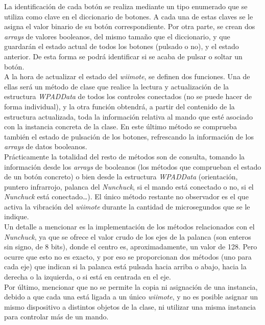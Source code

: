 La identificación de cada botón se realiza mediante un tipo enumerado que se utiliza como clave en el diccionario de botones. A cada una de estas claves se le asigna el valor binario de su botón correspondiente. Por otra parte, se crean dos \emph{arrays} de valores booleanos, del mismo tamaño que el diccionario, y que guardarán el estado actual de todos los botones (pulsado o no), y el estado anterior. De esta forma se podrá identificar si se acaba de pulsar o soltar un botón.\\

A la hora de actualizar el estado del \emph{wiimote}, se definen dos funciones. Una de ellas será un método de clase que realice la lectura y actualización de la estructura \emph{WPADData} de todos los controles conectados (no se puede hacer de forma individual), y la otra función obtendrá, a partir del contenido de la estructura actualizada, toda la información relativa al mando que esté asociado con la instancia concreta de la clase. En este último método se comprueba también el estado de pulsación de los botones, refrescando la información de los \emph{arrays} de datos booleanos.\\

Prácticamente la totalidad del resto de métodos son de consulta, tomando la información desde los \emph{arrays} de booleanos (los métodos que comprueban el estado de un botón concreto) o bien desde la estructura \emph{WPADData} (orientación, puntero infrarrojo, palanca del \emph{Nunchuck}, si el mando está conectado o no, si el \emph{Nunchuck} está conectado\ldots). El único método restante no observador es el que activa la vibración del \emph{wiimote} durante la cantidad de microsegundos que se le indique.\\

Un detalle a mencionar es la implementación de los métodos relacionados con el \emph{Nunchuck}, ya que se ofrece el valor crudo de los ejes de la palanca (son enteros sin signo, de 8 bits), donde el centro es, aproximadamente, un valor de 128. Pero ocurre que esto no es exacto, y por eso se proporcionan dos métodos (uno para cada eje) que indican si la palanca está pulsada hacia arriba o abajo, hacia la derecha o la izquierda, o si está en centrada en el eje.\\

Por último, mencionar que no se permite la copia ni asignación de una instancia, debido a que cada una está ligada a un único \emph{wiimote}, y no es posible asignar un mismo dispositivo a distintos objetos de la clase, ni utilizar una misma instancia para controlar más de un mando.\\


